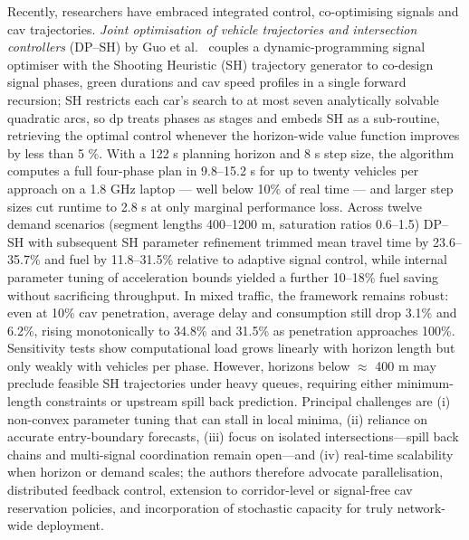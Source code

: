 \mynewline
Recently, researchers have embraced integrated control, co-optimising signals and \ac{cav} trajectories. \textit{Joint optimisation of vehicle trajectories and intersection controllers} (DP–SH) by Guo et al.~\cite{Guo2019} couples a dynamic-programming signal optimiser with the Shooting Heuristic (SH) trajectory generator to co-design signal phases, green durations and \ac{cav} speed profiles in a single forward recursion; SH restricts each car’s search to at most seven analytically solvable quadratic arcs, so \ac{dp} treats phases as stages and embeds SH as a sub-routine, retrieving the optimal control whenever the horizon-wide value function improves by less than 5 \%.  With a 122 s planning horizon and 8 s step size, the algorithm computes a full four-phase plan in 9.8–15.2 s for up to twenty vehicles per approach on a 1.8 GHz laptop --- well below 10\% of real time --- and larger step sizes cut runtime to 2.8 s at only marginal performance loss.  Across twelve demand scenarios (segment lengths 400–1200 m, saturation ratios 0.6–1.5) DP–SH with subsequent SH parameter refinement trimmed mean travel time by 23.6–35.7\% and fuel by 11.8–31.5\% relative to adaptive signal control, while internal parameter tuning of acceleration bounds yielded a further 10–18\% fuel saving without sacrificing throughput.  In mixed traffic, the framework remains robust: even at 10\% \ac{cav} penetration, average delay and consumption still drop 3.1\% and 6.2\%, rising monotonically to 34.8\% and 31.5\% as penetration approaches 100\%. Sensitivity tests show computational load grows linearly with horizon length but only weakly with vehicles per phase. However, horizons below \(\approx\) 400 m may preclude feasible SH trajectories under heavy queues, requiring either minimum-length constraints or upstream spill back prediction. Principal challenges are (i) non-convex parameter tuning that can stall in local minima, (ii) reliance on accurate entry-boundary forecasts, (iii) focus on isolated intersections—spill back chains and multi-signal coordination remain open—and (iv) real-time scalability when horizon or demand scales; the authors therefore advocate parallelisation, distributed feedback control, extension to corridor-level or signal-free \ac{cav} reservation policies, and incorporation of stochastic capacity for truly network-wide deployment.
\mynewline
